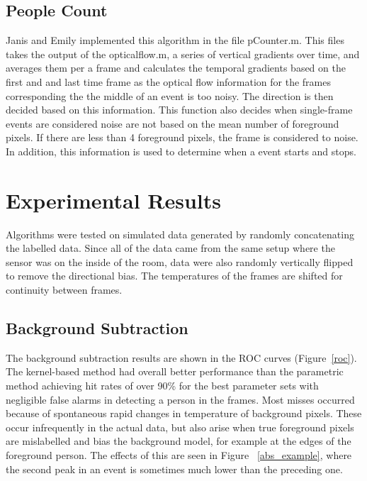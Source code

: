 \documentclass[12pt,oneside]{article} %
\begin{document}
\subsection{People Count}
Janis and Emily implemented this algorithm in the file pCounter.m. This files takes the output of the opticalflow.m, a series of vertical gradients over time, and averages them per a frame and calculates the temporal gradients based on the first and and last time frame as the optical flow information for the frames corresponding the the middle of an event is too noisy. The direction is then decided based on this information. This function also decides when single-frame events are considered noise are not based on the mean number of foreground pixels. If there are less than 4 foreground pixels, the frame is considered to noise. In addition, this information is used to determine when a event starts and stops.

\section{Experimental Results}  %
Algorithms were tested on simulated data generated by randomly concatenating the labelled data. Since all
of the data came from the same setup where the sensor was on the inside of the room, data were also
randomly vertically flipped to remove the directional bias.
The temperatures of the frames are shifted for continuity between frames. 

\subsection{Background Subtraction}  %
The background subtraction results are shown in the ROC curves (Figure~\ref{roc}).
The kernel-based method
had overall better performance than the parametric method achieving hit rates of over 90\% for the best
parameter sets with negligible false alarms in detecting a person in the frames. Most misses occurred
because of spontaneous rapid changes in temperature of background pixels. These occur infrequently
in the actual data, but also arise when true foreground pixels are mislabelled and bias the background model, for 
example at the edges of the foreground person. The effects of this are seen in Figure~ \ref{abs_example}, where
the second peak in an event is sometimes much lower than the preceding one.
\end{document}
